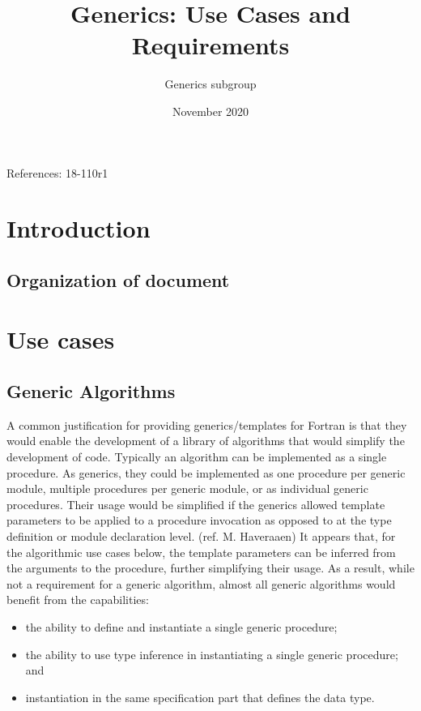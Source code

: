 \documentclass{article}
\title{Generics: Use Cases and Requirements}
\author{Generics subgroup}
\date{November 2020}
\newcounter{requirement}
\begin{document}
\maketitle
References: 18-110r1

\section{Introduction}
\subsection{Organization of document}

\section{Use cases}

\subsection{Generic Algorithms}

A common justification for providing generics/templates for Fortran is
that they would enable the development of a library of algorithms that
would simplify the development of code.
Typically an algorithm can be implemented as a single procedure.
As generics, they could be implemented as one
procedure per generic module, multiple procedures per generic
module, or as individual generic procedures.
Their usage would be simplified if the generics allowed template
parameters to be applied to a procedure invocation as opposed to at
the type definition or module declaration level.  (ref. M. Haveraaen)
It appears that, for the algorithmic use cases below, the template
parameters can be inferred from the arguments to the procedure,
further simplifying their usage. As a result, while  not a requirement
for a generic algorithm, almost all generic algorithms would benefit
from   the  capabilities:
\begin{itemize}
\item the ability to define and instantiate a single generic procedure;

\item the ability to use type inference in instantiating a single
  generic procedure; and

\item instantiation in the same specification part that defines the
  data type.
\end{itemize}
\end{document}
